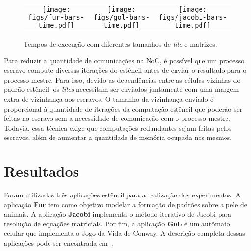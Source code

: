 \documentclass[12pt]{article}
\begin{document}
\begin{figure}[t]
	\begin{center}
		\begin{tabular}{ccc}
			\texttt{[image: figs/fur-bars-time.pdf]} & \texttt{[image: figs/gol-bars-time.pdf]} & \texttt{[image: figs/jacobi-bars-time.pdf]} \\
		\end{tabular}
      \vspace{-2ex}
	    \caption{Tempos de execução com diferentes tamanhos de \textit{tile} e matrizes.}\label{fig:results-bar}
	\end{center}
   \vspace{-2ex}

\end{figure}
Para reduzir a quantidade de comunicações na NoC, é possível que um processo escravo compute diversas iterações do estêncil antes de enviar o resultado para o processo mestre. 
Para isso, devido as dependências entre as células vizinhas do padrão estêncil, os \textit{tiles} necessitam ser enviados juntamente com uma margem extra de vizinhança aos escravos.
O tamanho da vizinhança enviado é proporcional à quantidade de iterações da computação estêncil que poderão ser feitas no escravo sem a necessidade de comunicação com o processo mestre. Todavia, essa técnica exige que computações redundantes sejam feitas pelos escravos, além de aumentar a quantidade de memória ocupada nos mesmos.

\section{Resultados}
\label{sec:resultados}

Foram utilizadas três aplicações estêncil para a realização dos experimentos. A aplicação \textbf{Fur} tem como objetivo modelar a formação de padrões sobre a pele de animais. A aplicação \textbf{Jacobi} implementa o método iterativo de Jacobi para resolução de equações matriciais. Por fim, a aplicação \textbf{GoL} é um autômato celular que implementa o Jogo da Vida de Conway. A descrição completa dessas aplicações pode ser encontrada em~\cite{pereira15, Castro-Podesta-ERAD:2016}.
\end{document}
